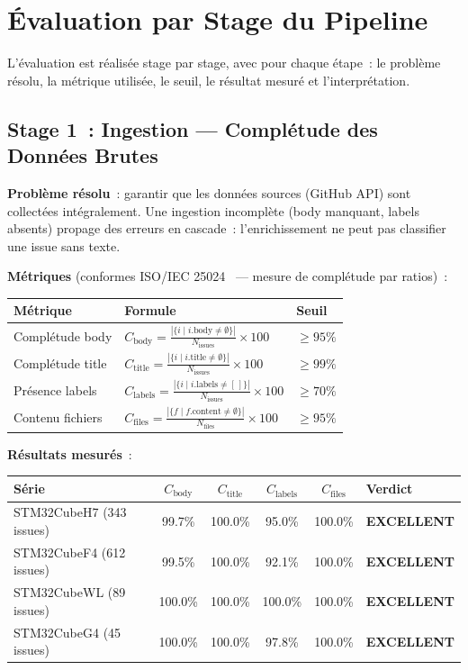 \section{Évaluation par Stage du Pipeline}
\label{sec:eval_par_stage}

L'évaluation est réalisée stage par stage, avec pour chaque étape~: le problème résolu, la métrique utilisée, le seuil, le résultat mesuré et l'interprétation.

\subsection{Stage 1~: Ingestion --- Complétude des Données Brutes}
\label{sec:eval_stage1}

\textbf{Problème résolu}~: garantir que les données sources (GitHub API) sont collectées intégralement. Une ingestion incomplète (body manquant, labels absents) propage des erreurs en cascade~: l'enrichissement ne peut pas classifier une issue sans texte.

\textbf{Métriques} (conformes ISO/IEC 25024~\cite{iso25024} --- mesure de complétude par ratios)~:

\begin{longtable}{p{4cm}p{6.5cm}p{2cm}}
\toprule
\textbf{Métrique} & \textbf{Formule} & \textbf{Seuil} \\
\midrule
Complétude body & $C_{\text{body}} = \frac{|\{i \mid i.\text{body} \neq \emptyset\}|}{N_{\text{issues}}} \times 100$ & $\geq 95\%$ \\
Complétude title & $C_{\text{title}} = \frac{|\{i \mid i.\text{title} \neq \emptyset\}|}{N_{\text{issues}}} \times 100$ & $\geq 99\%$ \\
Présence labels & $C_{\text{labels}} = \frac{|\{i \mid i.\text{labels} \neq [\,]\}|}{N_{\text{issues}}} \times 100$ & $\geq 70\%$ \\
Contenu fichiers & $C_{\text{files}} = \frac{|\{f \mid f.\text{content} \neq \emptyset\}|}{N_{\text{files}}} \times 100$ & $\geq 95\%$ \\
\bottomrule
\end{longtable}

\textbf{Résultats mesurés}~:

\begin{longtable}{lccccl}
\toprule
\textbf{Série} & $C_{\text{body}}$ & $C_{\text{title}}$ & $C_{\text{labels}}$ & $C_{\text{files}}$ & \textbf{Verdict} \\
\midrule
STM32CubeH7 (343 issues) & 99.7\% & 100.0\% & 95.0\% & 100.0\% & \textcolor{green!60!black}{\textbf{EXCELLENT}} \\
STM32CubeF4 (612 issues) & 99.5\% & 100.0\% & 92.1\% & 100.0\% & \textcolor{green!60!black}{\textbf{EXCELLENT}} \\
STM32CubeWL (89 issues) & 100.0\% & 100.0\% & 100.0\% & 100.0\% & \textcolor{green!60!black}{\textbf{EXCELLENT}} \\
STM32CubeG4 (45 issues) & 100.0\% & 100.0\% & 97.8\% & 100.0\% & \textcolor{green!60!black}{\textbf{EXCELLENT}} \\
\bottomrule
\end{longtable}

